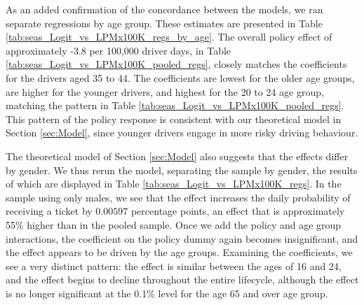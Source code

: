 As an added confirmation of the concordance between the models, 
we ran separate regressions by age group. 
These estimates are presented in 
Table \ref{tab:seas_Logit_vs_LPMx100K_regs_by_age}. 
The overall policy effect of approximately -3.8 per 100,000 driver days, 
in Table \ref{tab:seas_Logit_vs_LPMx100K_pooled_regs}, 
closely matches the coefficients for the drivers aged 35 to 44. 
The coefficients are lowest for the older age groups, 
are higher for the younger drivers, 
and highest for the 20 to 24 age group, 
matching the pattern in Table \ref{tab:seas_Logit_vs_LPMx100K_pooled_regs}. 
This pattern of the policy response is consistent 
with our theoretical model in Section \ref{sec:Model}, 
since younger drivers engage in more risky driving behaviour. 





The theoretical model of Section \ref{sec:Model} 
also suggests that the effects differ by gender. 
We thus rerun the model, separating the sample by gender, 
the results of which are displayed in 
Table \ref{tab:seas_Logit_vs_LPMx100K_regs}.
In the sample using only males, 
we see that the effect increases the daily probability of receiving a ticket by $0.00597$ 
percentage points, an effect that is approximately 55\% higher than in the pooled sample. 
Once we add the policy and age group interactions, 
the coefficient on the policy dummy again becomes insignificant, 
and the effect appears to be driven by the age groups. 
Examining the coefficients, we see a very distinct pattern: 
the effect is similar between the ages of 16 and 24, 
and the effect begins to decline throughout the entire lifecycle, 
although the effect is no longer significant at the 0.1\% level for the age 65 and over age group.

